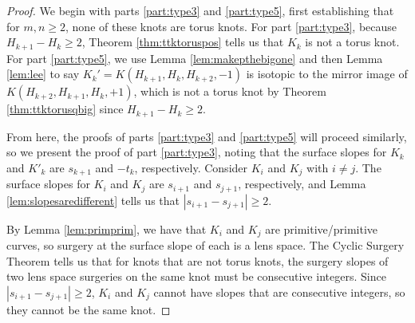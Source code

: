 \documentclass{amsart}
\begin{document}
\begin{proof}
We begin with parts \ref{part:type3} and \ref{part:type5}, first establishing that for $m,n \ge 2$, none of these knots are torus knots. For part  \ref{part:type3}, because $H_{k+1} - H_k \ge 2$, Theorem \ref{thm:ttktoruspos} tells us that $K_k$ is not a torus knot. For part \ref{part:type5}, we use Lemma \ref{lem:makepthebigone} and then Lemma \ref{lem:lee} to say $K_k' = K(H_{k+1}, H_{k}, H_{k+2}, -1)$ is isotopic to the mirror image of $K(H_{k+2}, H_{k+1}, H_{k}, +1)$, which is not a torus knot by Theorem \ref{thm:ttktorusqbig} since $H_{k+1} - H_k \ge 2$.

From here, the proofs of parts \ref{part:type3} and \ref{part:type5} will proceed similarly, so we present the proof of part \ref{part:type3}, noting that the surface slopes for $K_k$ and $K'_k$ are $s_{k+1}$ and $-t_k$, respectively.  Consider $K_{i}$ and $K_{j}$ with $i \neq j$. The surface slopes for $K_{i}$ and $K_{j}$ are  $s_{i+1}$ and $s_{j+1}$, respectively, and Lemma \ref{lem:slopesaredifferent} tells us that $|s_{i+1} - s_{j+1}| \ge 2$. 

By Lemma \ref{lem:primprim}, we have that $K_i$ and $K_j$ are primitive/primitive curves, so surgery at the surface slope of each is a lens space. The Cyclic Surgery Theorem \cite{CGLS} tells us that for knots that are not torus knots, the surgery slopes of two lens space surgeries on the same knot must be consecutive integers. Since $|s_{i+1} - s_{j+1}| \ge 2$, $K_i$ and $K_j$ cannot have slopes that are consecutive integers, so they cannot be the same knot.




\end{proof}
\end{document}
